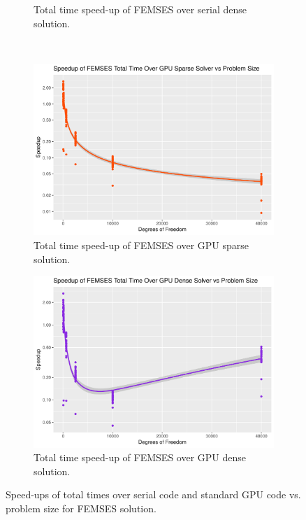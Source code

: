 \begin{figure}
\begin{subfigure}{0.48\linewidth}
		\caption{Total time speed-up of FEMSES over serial dense solution.}
		\label{fig:tot_femses_dense}
	\end{subfigure}\\
	\begin{subfigure}{0.48\linewidth}
		\centering
		\includegraphics[width=\linewidth]{Plots/total_femses_gpu_sparse_speedup_vs_n}
		\caption{Total time speed-up of FEMSES over GPU sparse solution.}
		\label{fig:tot_femses_gpu_sparse}
	\end{subfigure}\hfill
	\begin{subfigure}{0.48\linewidth}
		\centering
		\includegraphics[width=\linewidth]{Plots/total_femses_gpu_dense_speedup_vs_n}
		\caption{Total time speed-up of FEMSES over GPU dense solution.}
		\label{fig:tot_femses_gpu_dense}
	\end{subfigure}
	\caption{Speed-ups of total times over serial code and standard GPU code vs. problem size for FEMSES solution.}
	\label{fig:tot_femses}
\end{figure}

